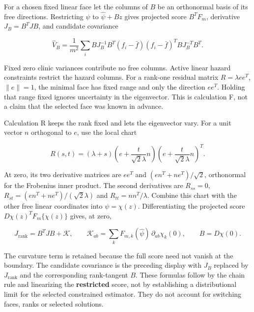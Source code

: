 \documentclass[11pt]{article}
\begin{document}
For a chosen fixed linear face let the columns of \(B\) be an orthonormal basis of its free directions. Restricting \(\psi\) to \(\widehat\psi+Bz\) gives projected score \(B^TF_m\), derivative \(J_B=B^TJB\), and candidate covariance

\begin{equation*}
\widehat V_B=\frac1{m^2}\sum_i
B J_B^{-1}B^T(f_i-\bar f)(f_i-\bar f)^T B J_B^{-T}B^T.
\end{equation*}

Fixed zero clinic variances contribute no free columns. Active linear hazard constraints restrict the hazard columns. For a rank-one residual matrix \(R=\lambda ee^T\), \(\|e\|=1\), the minimal face has fixed range and only the direction \(ee^T\). Holding that range fixed ignores uncertainty in the eigenvector. This is calculation F, not a claim that the selected face was known in advance.

Calculation R keeps the rank fixed and lets the eigenvector vary. For a unit vector \(n\) orthogonal to \(e\), use the local chart

\begin{equation*}
R(s,t)=(\lambda+s)
\left(e+\frac{t}{\sqrt2\lambda}n\right)
\left(e+\frac{t}{\sqrt2\lambda}n\right)^T.
\end{equation*}

At zero, its two derivative matrices are \(ee^T\) and \((en^T+ne^T)/\sqrt2\), orthonormal for the Frobenius inner product. The second derivatives are \(R_{ss}=0\), \(R_{st}=(en^T+ne^T)/(\sqrt2\lambda)\) and \(R_{tt}=nn^T/\lambda\). Combine this chart with the other free linear coordinates into \(\psi=\chi(z)\). Differentiating the projected score \(D\chi(z)^TF_m\{\chi(z)\}\) gives, at zero,

\begin{equation*}
J_{\mathrm{rank}}=B^TJB+\mathcal K,\qquad
\mathcal K_{ab}=\sum_k F_{m,k}(\widehat\psi)\,
\partial_{ab}\chi_k(0),\qquad B=D\chi(0).
\end{equation*}

The curvature term is retained because the full score need not vanish at the boundary. The candidate covariance is the preceding display with \(J_B\) replaced by \(J_{\mathrm{rank}}\) and the corresponding rank-tangent \(B\). These formulas follow by the chain rule and linearizing the \textbf{restricted} score, not by establishing a distributional limit for the selected constrained estimator. They do not account for switching faces, ranks or selected solutions.
\end{document}
